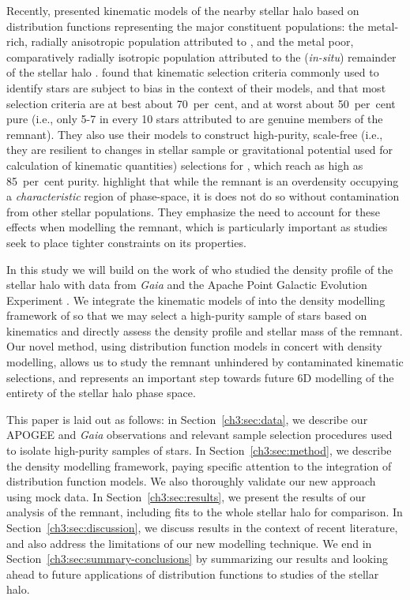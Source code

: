 Recently, \textcite[][hereafter LBM22]{lane22} presented kinematic models of the nearby stellar halo based on distribution functions representing the major constituent populations: the metal-rich, radially anisotropic population attributed to \gse, and the metal poor, comparatively radially isotropic population attributed to the (\textit{in-situ}) remainder of the stellar halo \parencite[e.g.][]{belokurov18,haywood18}. \cite{lane22} found that kinematic selection criteria commonly used to identify \gse stars are subject to bias in the context of their models, and that most selection criteria are at best about 70~per~cent, and at worst about 50~per~cent pure (i.e., only 5-7 in every 10 stars attributed to \gse are genuine members of the \gse remnant). They also use their models to construct high-purity, scale-free (i.e., they are resilient to changes in stellar sample or gravitational potential used for calculation of kinematic quantities) selections for \gse, which reach as high as 85~per~cent purity. \cite{lane22} highlight that while the \gse remnant is an overdensity occupying a \textit{characteristic} region of phase-space, it is does not do so without contamination from other stellar populations. They emphasize the need to account for these effects when modelling the \gse remnant, which is particularly important as studies seek to place tighter constraints on its properties.

In this study we will build on the work of \textcite[][hereafter MB20]{mackereth20} who studied the density profile of the stellar halo with data from \textit{Gaia} and the Apache Point Galactic Evolution Experiment \parencite[APOGEE][]{apogee}. We integrate the kinematic models of \cite{lane22} into the density modelling framework of \cite{mackereth20} so that we may select a high-purity sample of \gse stars based on kinematics and directly assess the density profile and stellar mass of the remnant. Our novel method, using distribution function models in concert with density modelling, allows us to study the \gse remnant unhindered by contaminated kinematic selections, and represents an important step towards future 6D modelling of the entirety of the stellar halo phase space.

This paper is laid out as follows: in Section~\ref{ch3:sec:data}, we describe our APOGEE and \textit{Gaia} observations and relevant sample selection procedures used to isolate high-purity samples of \gse stars. In Section~\ref{ch3:sec:method}, we describe the density modelling framework, paying specific attention to the integration of distribution function models. We also thoroughly validate our new approach using mock data. In Section~\ref{ch3:sec:results}, we present the results of our analysis of the \gse remnant, including fits to the whole stellar halo for comparison. In Section~\ref{ch3:sec:discussion}, we discuss results in the context of recent literature, and also address the limitations of our new modelling technique. We end in Section~\ref{ch3:sec:summary-conclusions} by summarizing our results and looking ahead to future applications of distribution functions to studies of the stellar halo.

